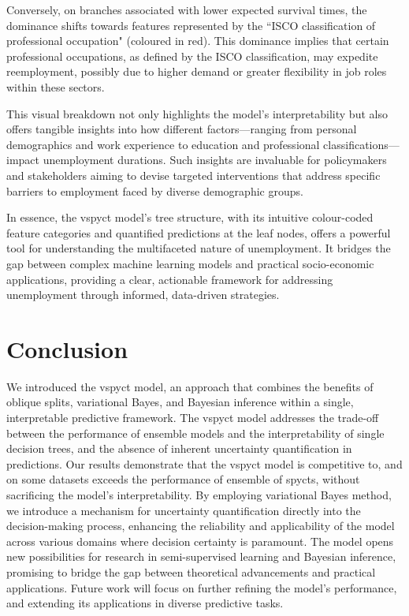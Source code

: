 \documentclass[3p,review,authoryear]{elsarticle}
\begin{document}
Conversely, on branches associated with lower expected survival times, the dominance shifts towards features represented by the ``ISCO classification of professional occupation" (coloured in red).
This dominance implies that certain professional occupations, as defined by the ISCO classification, may expedite reemployment, possibly due to higher demand or greater flexibility in job roles within these sectors.

This visual breakdown not only highlights the model's interpretability but also offers tangible insights into how different factors—ranging from personal demographics and work experience to education and professional classifications—impact unemployment durations.
Such insights are invaluable for policymakers and stakeholders aiming to devise targeted interventions that address specific barriers to employment faced by diverse demographic groups.

In essence, the \gls{vspyct} model's tree structure, with its intuitive colour-coded feature categories and quantified predictions at the leaf nodes, offers a powerful tool for understanding the multifaceted nature of unemployment.
It bridges the gap between complex machine learning models and practical socio-economic applications, providing a clear, actionable framework for addressing unemployment through informed, data-driven strategies.


\section{Conclusion}

We introduced the \gls{vspyct} model, an approach that combines the benefits of oblique splits, variational Bayes, and Bayesian inference within a single, interpretable predictive framework.
The \gls{vspyct} model addresses the trade-off between the performance of ensemble models and the interpretability of single decision trees, and the absence of inherent uncertainty quantification in predictions.
Our results demonstrate that the \gls{vspyct} model is competitive to, and on some datasets exceeds the performance of ensemble of \glspl{spyct}, without sacrificing the model's interpretability.
By employing variational Bayes method, we introduce a mechanism for uncertainty quantification directly into the decision-making process, enhancing the reliability and applicability of the model across various domains where decision certainty is paramount.
The model opens new possibilities for research in semi-supervised learning and Bayesian inference, promising to bridge the gap between theoretical advancements and practical applications.
Future work will focus on further refining the model's performance, and extending its applications in diverse predictive tasks.
\end{document}
